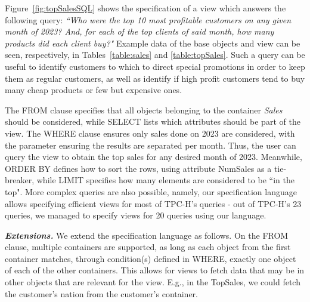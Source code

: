 \documentclass{vldb}
\newcommand{\qcr}[1]{{\fontfamily{qcr}\selectfont #1}}
\begin{document}
Figure~\ref{fig:topSalesSQL} shows the specification of a view which answers the following query: \emph{``Who were the top 10 most profitable customers on any given month of 2023? And, for each of the top clients of said month, how many products did each client buy?"}
Example data of the base objects and view can be seen, respectively, in Tables~\ref{table:sales} and \ref{table:topSales}.
Such a query can be useful to identify customers to which to direct special promotions in order to keep them as regular customers, as well as identify if high profit customers tend to buy many cheap products or few but expensive ones.

The \qcr{FROM} clause specifies that all objects belonging to the container \emph{Sales} should be considered, while \qcr{SELECT} lists which attributes should be part of the view.
The \qcr{WHERE} clause ensures only sales done on 2023 are considered, with the parameter \qcr{[MONTH]} ensuring the results are separated per month.
Thus, the user can query the view to obtain the top sales for any desired month of 2023.
Meanwhile, \qcr{ORDER BY} defines how to sort the rows, using attribute \qcr{NumSales} as a tie-breaker, while \qcr{LIMIT} specifies how many elements are considered to be ``in the top".
More complex queries are also possible, namely, our specification language allows specifying efficient views for most of TPC-H's queries - out of TPC-H's 23 queries, we managed to specify views for 20 queries using our language.

\emph{\textbf{Extensions.}} We extend the specification language as follows.
On the \qcr{FROM} clause, multiple containers are supported, as long as each object from the first container matches, through condition(s) defined in \qcr{WHERE}, exactly one object of each of the other containers.
This allows for views to fetch data that may be in other objects that are relevant for the view.
E.g., in the TopSales, we could fetch the customer's nation from the customer's container.
\end{document}
